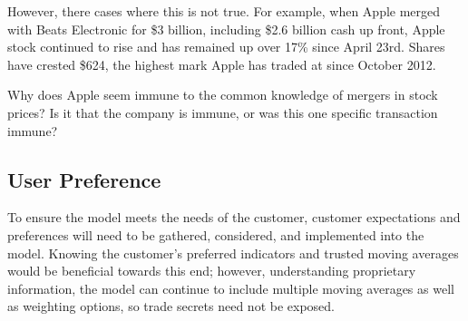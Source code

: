 \documentclass[11pt]{article}
\begin{document}
However, there cases where this is not true. For example, when Apple merged with Beats Electronic for \$3 billion, including \$2.6 billion cash up front, Apple stock continued to rise and has remained up over 17\% since April 23rd. Shares have crested \$624, the highest mark Apple has traded at since October 2012.\textsuperscript{\cite{FORBES}}

Why does Apple seem immune to the common knowledge of mergers in stock prices? Is it that the company is immune, or was this one specific transaction immune?

\subsection*{User Preference}\label{UP}
To ensure the model meets the needs of the customer, customer expectations and preferences will need to be gathered, considered, and implemented into the model. Knowing the customer's preferred indicators and trusted moving averages would be beneficial towards this end; however, understanding proprietary information, the model can continue to include multiple moving averages as well as weighting options, so trade secrets need not be exposed.





\end{document}
